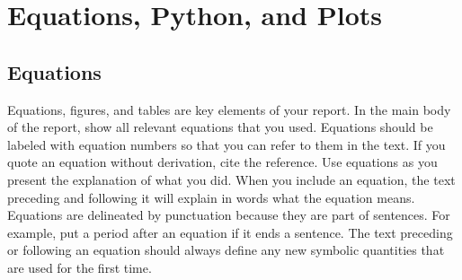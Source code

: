 \documentclass[12pt,preprint]{aastex}
\begin{document}
\section{Equations, Python, and Plots} \label{plotting}

\subsection{Equations}

\noindent
Equations, figures, and tables are key elements of your report. In the main body of the report, show all relevant equations that you used. Equations should be labeled with equation numbers so that you can refer to them in the text. If you quote an equation without derivation, cite the reference. Use equations as you present the explanation of what you did. When you include an equation, the text preceding and following it will explain in words what the equation means. Equations are delineated by punctuation because they are part of sentences. For example, put a period after an equation if it ends a sentence. The text preceding or following an equation should always define any new symbolic quantities that are used for the first time.
\end{document}
